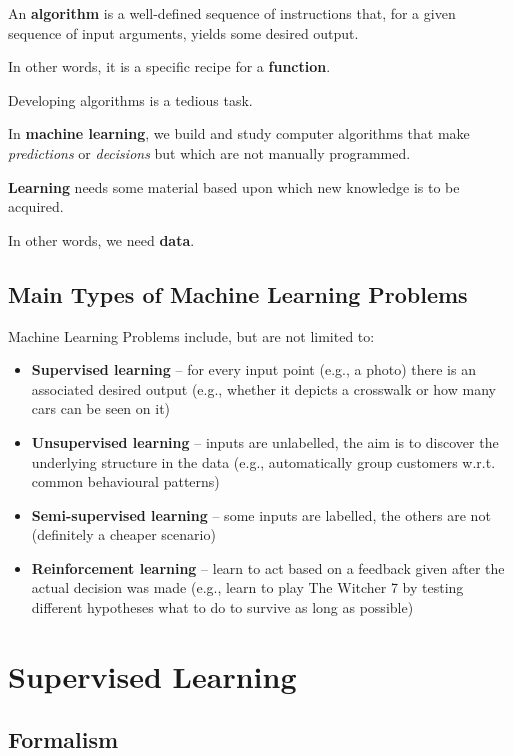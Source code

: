 \documentclass[10pt,b5paper,krantz1]{krantz}
\begin{document}
An \textbf{algorithm} is a well-defined sequence of instructions that,
for a given sequence of input arguments,
yields some desired output.

In other words, it is a specific recipe for a \textbf{function}.

Developing algorithms is a tedious task.

In \textbf{machine learning}, we build and study computer algorithms
that make \emph{predictions} or \emph{decisions} but which are not
manually programmed.

\textbf{Learning} needs some material based upon which new knowledge is to be acquired.

In other words, we need \textbf{data}.

\hypertarget{main-types-of-machine-learning-problems}{%
\subsection{Main Types of Machine Learning Problems}\label{main-types-of-machine-learning-problems}}

Machine Learning Problems include, but are not limited to:

\begin{itemize}
\item
  \textbf{Supervised learning} -- for every input point (e.g., a photo)
  there is an associated desired output (e.g., whether it depicts a crosswalk
  or how many cars can be seen on it)
\item
  \textbf{Unsupervised learning} -- inputs are unlabelled, the aim is to discover
  the underlying structure in the data (e.g., automatically group customers
  w.r.t. common behavioural patterns)
\item
  \textbf{Semi-supervised learning} -- some inputs are labelled, the others
  are not (definitely a cheaper scenario)
\item
  \textbf{Reinforcement learning} -- learn to act based on a
  feedback given after the actual decision was made
  (e.g., learn to play The Witcher 7 by testing different hypotheses
  what to do to survive as long as possible)
\end{itemize}

\hypertarget{supervised-learning}{%
\section{Supervised Learning}\label{supervised-learning}}

\hypertarget{formalism}{%
\subsection{Formalism}\label{formalism}}
\end{document}
